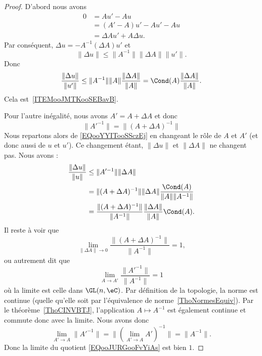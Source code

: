 \begin{proof}
	D'abord nous avons
	\begin{subequations}
		\begin{align}
			0 & =Au'-Au                \\
			  & =(A'-A)u'-Au'-Au       \\
			  & =\Delta Au'+A\Delta u.
		\end{align}
	\end{subequations}
	Par conséquent, \( \Delta u=-A^{-1}(\Delta A)u'\) et
	\begin{equation}        \label{EQooYYITooSSczEj}
		\| \Delta u \|\leq \| A^{-1} \|\| \Delta A \|\| u' \|.
	\end{equation}
	Donc
	\begin{equation}
		\frac{ \| \Delta u \| }{ \| u' \| }\leq   \| A^{-1} \|\| A \|\frac{ \| \Delta A \| }{ \| A \| }   =\Cond(A)\frac{ \| \Delta A \| }{ \| A \| }.
	\end{equation}
	Cela est~\ref{ITEMooJMTKooSEBavB}.

	Pour l'autre inégalité, nous avons \( A'=A+\Delta A\) et donc
	\begin{equation}
		\| A'^{-1} \|=\| (A+\Delta A)^{-1} \|
	\end{equation}
	Nous repartons alors de \eqref{EQooYYITooSSczEj} en changeant le rôle de \( A\) et \( A'\) (et donc aussi de \( u\) et \( u'\)). Ce changement étant, \( \| \Delta u \|\) et \( \| \Delta A \|\) ne changent pas. Nous avons :
	\begin{subequations}
		\begin{align}
			\frac{ \| \Delta u \| }{ \| u \| } & \leq \| A'^{-1} \|\| \Delta A \|                                                             \\
			                                   & =\| (A+\Delta A)^{-1} \|\| \Delta A \|\frac{ \Cond(A) }{ \| A \|\| A^{-1} \| }               \\
			                                   & =\frac{ \| (A+\Delta A)^{-1} \| }{ \| A^{-1} \| }\frac{ \| \Delta A \| }{ \| A \| }\Cond(A).
		\end{align}
	\end{subequations}
	Il reste à voir que
	\begin{equation}
		\lim_{\| \Delta A \|\to 0} \frac{ \| (A+\Delta A)^{-1} \| }{ \| A^{-1} \| }=1,
	\end{equation}
	ou autrement dit que
	\begin{equation}        \label{EQooJURGooFvYiAs}
		\lim_{A\to A'} \frac{ \| A'^{-1} \| }{ \| A^{-1} \| }=1
	\end{equation}
	où la limite est celle dans \( \GL(n,\eC)\). Par définition de la topologie, la norme est continue (quelle qu'elle soit par l'équivalence de norme~\ref{ThoNormesEquiv}). Par le théorème~\ref{ThoCINVBTJ}, l'application \( A\mapsto A^{-1}\) est également continue et commute donc avec la limite. Nous avons donc
	\begin{equation}
		\lim_{A'\to A}\| A'^{-1} \|=\| (\lim_{A'\to A} A')^{-1} \|=\| A^{-1} \|.
	\end{equation}
	Donc la limite du quotient \eqref{EQooJURGooFvYiAs} est bien \( 1\).
\end{proof}

